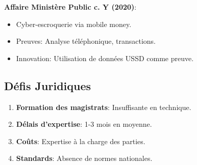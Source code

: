 \textbf{Affaire Ministère Public c. Y (2020)}:

\begin{itemize}
\item Cyber-escroquerie via mobile money.
\item Preuves: Analyse téléphonique, transactions.
\item Innovation: Utilisation de données USSD comme preuve.
\end{itemize}

\subsection{Défis Juridiques}
\begin{enumerate}
\item \textbf{Formation des magistrats}: Insuffisante en technique.
\item \textbf{Délais d'expertise}: 1-3 mois en moyenne.
\item \textbf{Coûts}: Expertise à la charge des parties.
\item \textbf{Standards}: Absence de normes nationales.
\end{enumerate}